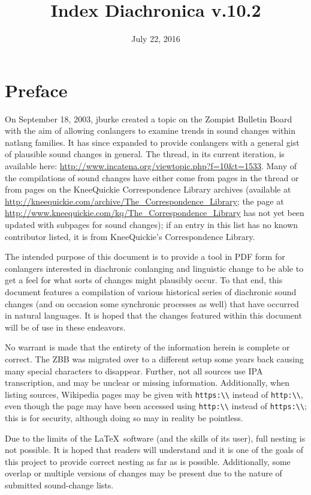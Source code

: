 \documentclass[11pt]{article}
\title{Index Diachronica v.10.2}
\date{July 22, 2016} %
\newcommand{\tab}{\hspace{25pt}}
\begin{document}
\maketitle
{}
\tableofcontents
\newpage
{}
\section{Preface}
\tab On September 18, 2003, jburke created a topic on the Zompist Bulletin Board with the aim of allowing conlangers to examine trends in sound changes within natlang families. It has since expanded to provide conlangers with a general gist of plausible sound changes in general. The thread, in its current iteration, is available here: \url{http://www.incatena.org/viewtopic.php?f=10&t=1533}. Many of the compilations of sound changes have either come from pages in the thread or from pages on the KneeQuickie Correspondence Library archives (available at \url{http://kneequickie.com/archive/The_Correspondence_Library}; the page at \url{http://www.kneequickie.com/kq/The_Correspondence_Library} has not yet been updated with subpages for sound changes); if an entry in this list has no known contributor listed, it is from KneeQuickie's Correspondence Library.

\tab The intended purpose of this document is to provide a tool in PDF form for conlangers interested in diachronic conlanging and linguistic change to be able to get a feel for what sorts of changes might plausibly occur. To that end, this document features a compilation of various historical series of diachronic sound changes (and on occasion some synchronic processes as well) that have occurred in natural languages. It is hoped that the changes featured within this document will be of use in these endeavors.

\tab No warrant is made that the entirety of the information herein is complete or correct. The ZBB was migrated over to a different setup some years back causing many special characters to disappear. Further, not all sources use IPA transcription, and may be unclear or missing information. Additionally, when listing sources, Wikipedia pages may be given with {\tt https:\textbackslash\textbackslash} instead of {\tt http:\textbackslash\textbackslash}, even though the page may have been accessed using {\tt http:\textbackslash\textbackslash} instead of {\tt https:\textbackslash\textbackslash}; this is for security, although doing so may in reality be pointless.

\tab Due to the limits of the \LaTeX\ software (and the skills of its user), full nesting is not possible. It is hoped that readers will understand and it is one of the goals of this project to provide correct nesting as far as is possible. Additionally, some overlap or multiple versions of changes may be present due to the nature of submitted sound-change lists.
\end{document}
